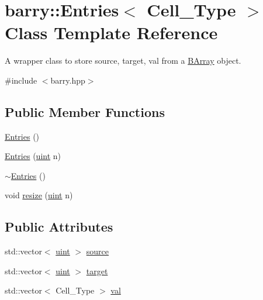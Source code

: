 \hypertarget{classbarry_1_1_entries}{}\section{barry\+:\+:Entries$<$ Cell\+\_\+\+Type $>$ Class Template Reference}
\label{classbarry_1_1_entries}


A wrapper class to store {\ttfamily source}, {\ttfamily target}, {\ttfamily val} from a {\ttfamily \hyperlink{classbarry_1_1_b_array}{B\+Array}} object.  




{\ttfamily \#include $<$barry.\+hpp$>$}

\subsection*{Public Member Functions}
\begin{DoxyCompactItemize}
\item 
\hyperlink{classbarry_1_1_entries_aa51d37ad8e5f441fd64c954dfab9ad04}{Entries} ()
\item 
\hyperlink{classbarry_1_1_entries_a22dda1d0afd4fbe4b658e55ca1b61f16}{Entries} (\hyperlink{namespacebarry_a11dfc53ddb4672278319aa04f1e09a6c}{uint} n)
\item 
\hyperlink{classbarry_1_1_entries_a8d74af4d3b545fb79f9f4e8e894160cb}{$\sim$\+Entries} ()
\item 
void \hyperlink{classbarry_1_1_entries_a0c1e6fb0a6e2c462ba782433ac11e026}{resize} (\hyperlink{namespacebarry_a11dfc53ddb4672278319aa04f1e09a6c}{uint} n)
\end{DoxyCompactItemize}
\subsection*{Public Attributes}
\begin{DoxyCompactItemize}
\item 
std\+::vector$<$ \hyperlink{namespacebarry_a11dfc53ddb4672278319aa04f1e09a6c}{uint} $>$ \hyperlink{classbarry_1_1_entries_a5992282ca5f39dbbbd4195d7176b6295}{source}
\item 
std\+::vector$<$ \hyperlink{namespacebarry_a11dfc53ddb4672278319aa04f1e09a6c}{uint} $>$ \hyperlink{classbarry_1_1_entries_a07de39535af23bc1f9e3918b32a39b18}{target}
\item 
std\+::vector$<$ Cell\+\_\+\+Type $>$ \hyperlink{classbarry_1_1_entries_af2570fcd2f42e9a1704f9c254507284c}{val}
\end{DoxyCompactItemize}


